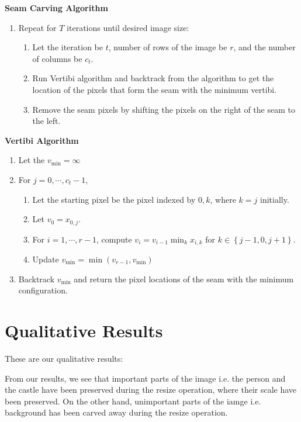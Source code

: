 \documentclass[a4paper]{article}
\begin{document}
	\textbf{Seam Carving Algorithm}
	\begin{enumerate}[noitemsep]
		\item Repeat for $T$ iterations until desired image size:
		\begin{enumerate}[noitemsep]
			\item Let the iteration be $t$, number of rows of the image be $r$, and the number of columns be $c_t$.
			\item Run Vertibi algorithm and backtrack from the algorithm to get the location of the pixels that form the seam with the minimum vertibi.
			\item Remove the seam pixels by shifting the pixels on the right of the seam to the left.
		\end{enumerate}
	\end{enumerate} 
	
	\textbf{Vertibi Algorithm}
	\begin{enumerate}[noitemsep]
		\item Let the $v_\text{min} = \infty$
		\item For $j = 0, \cdots, c_t-1$, 
		\begin{enumerate}[noitemsep]
			\item Let the starting pixel be the pixel indexed by $0,k$, where $k=j$ initially.
			\item Let $v_0 = x_{0,j}$.
			\item For $i=1, \cdots, r-1$, compute $v_i = v_{i-1}\min_k x_{i,k}$ for $k \in \left\{j-1, 0, j+1\right\}$. 
			\item Update $v_\text{min} = \min(v_{r-1}, v_\text{min})$ 
		\end{enumerate}
		\item Backtrack $v_\text{min}$ and return the pixel locations of the seam with the minimum configuration.
	\end{enumerate}
	
	\section{Qualitative Results}
	
	These are our qualitative results:
	
	From our results, we see that important parts of the image i.e. the person and the castle have been preserved during the resize operation, where their scale have been preserved. On the other hand, unimportant parts of the iamge i.e. background has been carved away during the resize operation.
	

	
	
	
\end{document}

